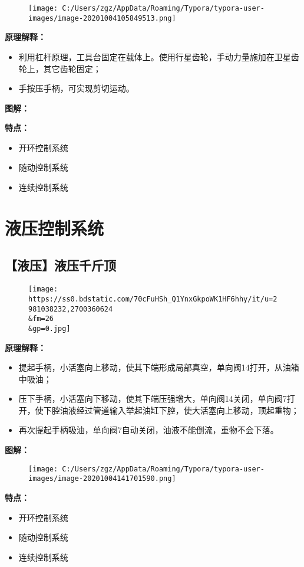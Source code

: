 \documentclass[
]{article}
\begin{document}
\begin{figure}
\centering
\texttt{[image: C:/Users/zgz/AppData/Roaming/Typora/typora-user-images/image-20201004105849513.png]}
\caption{}
\end{figure}

\textbf{原理解释：}

\begin{itemize}
\item
  利用杠杆原理，工具台固定在载体上。使用行星齿轮，手动力量施加在卫星齿轮上，其它齿轮固定；
\item
  手按压手柄，可实现剪切运动。
\end{itemize}

\textbf{图解：}

\textbf{特点：}

\begin{itemize}
\item
  开环控制系统
\item
  随动控制系统
\item
  连续控制系统
\end{itemize}

\hypertarget{header-n42}{%
\section{液压控制系统}\label{header-n42}}

\hypertarget{header-n43}{%
\subsection{【液压】液压千斤顶}\label{header-n43}}

\begin{figure}
\centering
\texttt{[image: https://ss0.bdstatic.com/70cFuHSh\_Q1YnxGkpoWK1HF6hhy/it/u=2981038232,2700360624\\\&fm=26\\\&gp=0.jpg]}
\caption{}
\end{figure}

\textbf{原理解释：}

\begin{itemize}
\item
  提起手柄，小活塞向上移动，使其下端形成局部真空，单向阀14打开，从油箱中吸油；
\item
  压下手柄，小活塞向下移动，使其下端压强增大，单向阀14关闭，单向阀7打开，使下腔油液经过管道输入举起油缸下腔，使大活塞向上移动，顶起重物；
\item
  再次提起手柄吸油，单向阀7自动关闭，油液不能倒流，重物不会下落。
\end{itemize}

\textbf{图解：}

\begin{figure}
\centering
\texttt{[image: C:/Users/zgz/AppData/Roaming/Typora/typora-user-images/image-20201004141701590.png]}
\caption{}
\end{figure}

\textbf{特点：}

\begin{itemize}
\item
  开环控制系统
\item
  随动控制系统
\item
  连续控制系统
\end{itemize}
\end{document}
